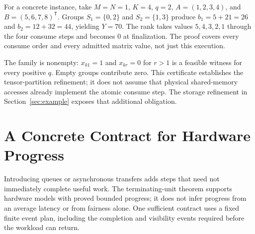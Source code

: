 \documentclass[11pt]{article}
\begin{document}
For a concrete instance, take $M=N=1$, $K=4$, $q=2$, $A=(1,2,3,4)$, and $B=(5,6,7,8)^{\mathsf T}$. Groups $S_1=\{0,2\}$ and $S_2=\{1,3\}$ produce $b_1=5+21=26$ and $b_2=12+32=44$, yielding $Y=70$. The rank takes values $5,4,3,2,1$ through the four consume steps and becomes $0$ at finalization. The proof covers every consume order and every admitted matrix value, not just this execution.

The family is nonempty: $x_{k1}=1$ and $x_{kr}=0$ for $r>1$ is a feasible witness for every positive $q$. Empty groups contribute zero. This certificate establishes the tensor-partition refinement; it does not assume that physical shared-memory accesses already implement the atomic consume step. The storage refinement in Section~\ref{sec:example} exposes that additional obligation.

\section{A Concrete Contract for Hardware Progress}\label{sec:hardware-progress}
Introducing queues or asynchronous transfers adds steps that need not immediately complete useful work. The terminating-unit theorem supports hardware models with proved bounded progress; it does not infer progress from an average latency or from fairness alone. One sufficient contract uses a fixed finite event plan, including the completion and visibility events required before the workload can return.
\end{document}
